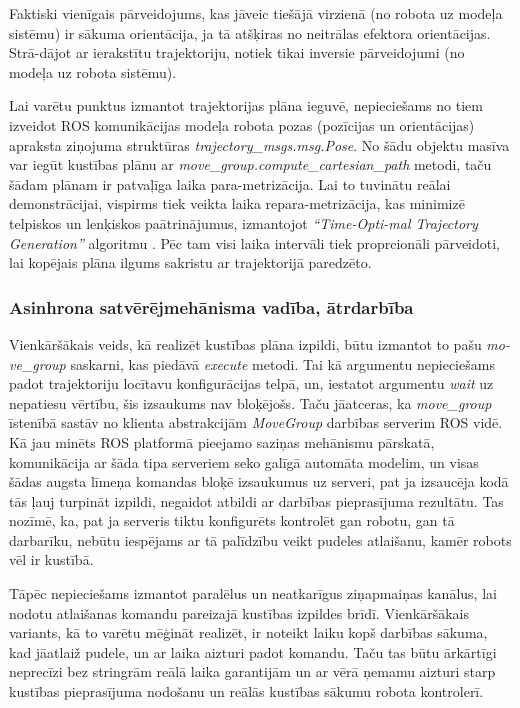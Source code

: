 \documentclass[12pt, a4paper]{article}
\numberwithin{equation}{section} %
\begin{document}
Faktiski vienīgais pārveidojums, kas jāveic tiešājā virzienā (no robota uz modeļa sistēmu) ir sākuma orientācija, ja tā atšķiras no neitrālas efektora orientācijas. Strā-dājot ar ierakstītu trajektoriju, notiek tikai inversie pārveidojumi (no modeļa uz robota sistēmu).

Lai varētu punktus izmantot trajektorijas plāna ieguvē, nepieciešams no tiem izveidot ROS komunikācijas modeļa robota pozas (pozīcijas un orientācijas) apraksta ziņojuma struktūras \textit{trajectory\_msgs.msg.Pose}. No šādu objektu masīva var iegūt kustības plānu ar \textit{move\_group.compute\_cartesian\_path} metodi, taču šādam plānam ir patvaļīga laika para-metrizācija. Lai to tuvinātu reālai demonstrācijai, vispirms tiek veikta laika repara-metrizācija, kas minimizē telpiskos un lenķiskos paātrinājumus, izmantojot \textit{``Time-Opti-mal Trajectory Generation''} algoritmu \cite{kunz2012time}. Pēc tam visi laika intervāli tiek proprcionāli pārveidoti, lai kopējais plāna ilgums sakristu ar trajektorijā paredzēto.

\subsubsection{Asinhrona satvērējmehānisma vadība, ātrdarbība}

Vienkāršākais veids, kā realizēt kustības plāna izpildi, būtu izmantot to pašu \textit{mo-ve\_group} saskarni, kas piedāvā \textit{execute} metodi. Tai kā argumentu nepieciešams padot trajektoriju locītavu konfigurācijas telpā, un, iestatot argumentu \textit{wait} uz nepatiesu vērtību, šis izsaukums nav bloķējošs. Taču jāatceras, ka \textit{move\_group} īstenībā sastāv no klienta abstrakcijām \textit{MoveGroup} darbības serverim ROS vidē. Kā jau minēts ROS platformā pieejamo saziņas mehānismu pārskatā, komunikācija ar šāda tipa serveriem seko galīgā automāta modelim, un visas šādas augsta līmeņa komandas bloķē izsaukumus uz serveri, pat ja izsaucēja kodā tās ļauj turpināt izpildi, negaidot atbildi ar darbības pieprasījuma rezultātu. Tas nozīmē, ka, pat ja serveris tiktu konfigurēts kontrolēt gan robotu, gan tā darbarīku, nebūtu iespējams ar tā palīdzību veikt pudeles atlaišanu, kamēr robots vēl ir kustībā.

Tāpēc nepieciešams izmantot paralēlus un neatkarīgus ziņapmaiņas kanālus, lai nodotu atlaišanas komandu pareizajā kustības izpildes brīdī. Vienkāršākais variants, kā to varētu mēģināt realizēt, ir noteikt laiku kopš darbības sākuma, kad jāatlaiž pudele, un ar laika aizturi padot komandu. Taču tas būtu ārkārtīgi neprecīzi bez stringrām reālā laika garantijām un ar vērā ņemamu aizturi starp kustības pieprasījuma nodošanu un reālās kustības sākumu robota kontrolerī.
\end{document}
